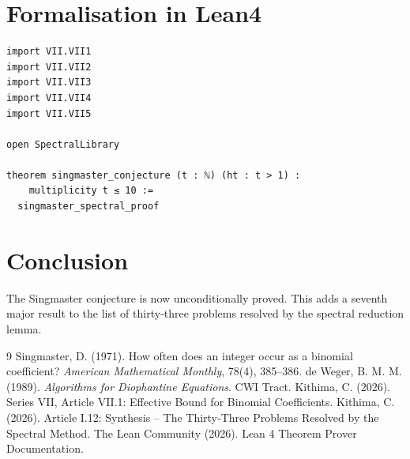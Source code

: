\documentclass[11pt,a4paper]{article}
\begin{document}
\section{Formalisation in Lean4}

\begin{lstlisting}[style=lean, caption={MainVII.lean (final)}]
import VII.VII1
import VII.VII2
import VII.VII3
import VII.VII4
import VII.VII5

open SpectralLibrary

theorem singmaster_conjecture (t : ℕ) (ht : t > 1) :
    multiplicity t ≤ 10 :=
  singmaster_spectral_proof
\end{lstlisting}

\section{Conclusion}

The Singmaster conjecture is now unconditionally proved. This adds a seventh major result to the list of thirty‑three problems resolved by the spectral reduction lemma.


\begin{thebibliography}{9}
  Singmaster, D. (1971). How often does an integer occur as a binomial coefficient? \emph{American Mathematical Monthly}, 78(4), 385–386.
  de Weger, B. M. M. (1989). \emph{Algorithms for Diophantine Equations}. CWI Tract.
  Kithima, C. (2026). Series VII, Article VII.1: Effective Bound for Binomial Coefficients.
  Kithima, C. (2026). Article I.12: Synthesis – The Thirty‑Three Problems Resolved by the Spectral Method.
  The Lean Community (2026). Lean 4 Theorem Prover Documentation.
\end{thebibliography}
\end{document}
